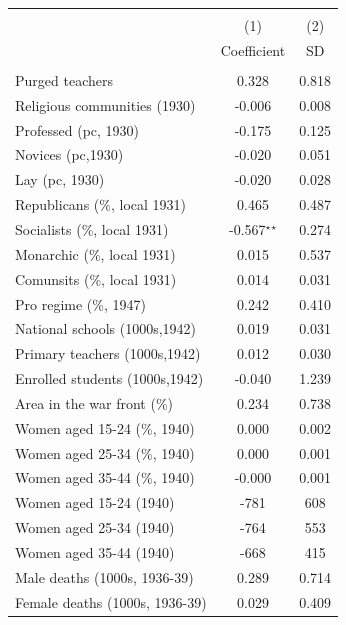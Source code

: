 \begin{tabular}{l c c }\hline\hline  \\[-0.3cm] & (1) & (2)  \\ [0.1cm] & {Coefficient} & {SD}  \\ [0.1cm] \hline \\ 
Purged teachers&	0.328&	0.818	\\
Religious communities (1930)&	-0.006&	0.008	\\
Professed (pc, 1930)&	-0.175&	0.125	\\
Novices (pc,1930)&	-0.020&	0.051	\\
Lay (pc, 1930)&	-0.020&	0.028	\\
Republicans (\%, local 1931)&	0.465&	0.487	\\
Socialists (\%, local 1931)&	-0.567$^\star$$^\star$&	0.274	\\
Monarchic (\%, local 1931)&	0.015&	0.537	\\
Comunsits (\%, local 1931)&	0.014&	0.031	\\
Pro regime (\%, 1947)&	0.242&	0.410	\\
National schools (1000s,1942)&	0.019&	0.031	\\
Primary teachers (1000s,1942)&	0.012&	0.030	\\
Enrolled students (1000s,1942)&	-0.040&	1.239	\\
Area in the war front (\%)&	0.234&	0.738	\\
Women aged 15-24 (\%, 1940) &	0.000&	0.002	\\
Women aged 25-34 (\%, 1940) &	0.000&	0.001	\\
Women aged 35-44 (\%, 1940) &	-0.000&	0.001	\\
Women aged 15-24 (1940) &	-781&	608	\\
Women aged 25-34 (1940) &	-764&	553	\\
Women aged 35-44 (1940) &	-668&	415	\\
Male deaths (1000s, 1936-39)&	0.289&	0.714	\\
Female deaths (1000s, 1936-39)&	0.029&	0.409	\\
\hline\hline \end{tabular}